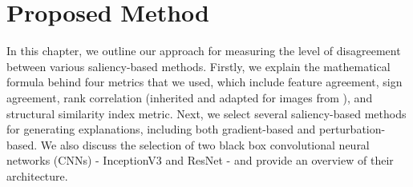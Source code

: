 \chapter{Proposed Method}
\label{ch:proposedMethod}
In this chapter, we outline our approach for measuring the level of disagreement between various saliency-based methods. Firstly, we explain the mathematical formula behind four metrics that we used, which include feature agreement, sign agreement, rank correlation (inherited and adapted for images from \cite{krishna_disagreement_problem}), and structural similarity index metric. Next, we select several saliency-based methods for generating explanations, including both gradient-based and perturbation-based. We also discuss the selection of two black box convolutional neural networks (CNNs) - InceptionV3 and ResNet - and provide an overview of their architecture.




